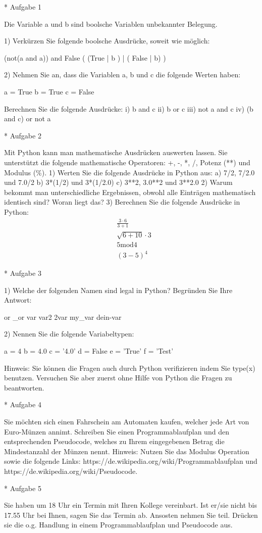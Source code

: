 * Aufgabe 1

Die Variable a und b sind boolsche Variablen unbekannter Belegung. 

1) Verkürzen Sie folgende boolsche Ausdrücke, soweit wie möglich: 

 (not(a and a)) and False
 ( (True | b ) | ( False | b) )
 
 2) Nehmen Sie an, dass die Variablen a, b und c die folgende Werten haben: 
 
 a = True
 b = True
 c = False
 
Berechnen Sie die folgende Ausdrücke:
i) b and c
ii) b or c
iii) not a and c
iv) (b and c) or not a

* Aufgabe 2

Mit Python kann man mathematische Ausdrücken auswerten lassen. Sie unterstützt die folgende mathematische Operatoren: +, -, *, /, Potenz (**) und Modulus (\%).   
1) Werten Sie die folgende Ausdrücke in Python aus: 
a) 7/2, 7/2.0 und 7.0/2
b) 3*(1/2) und 3*(1/2.0)
c) 3**2, 3.0**2 und 3**2.0
2) Warum bekommt man unterschiedliche Ergebnissen, obwohl alle Einträgen mathematisch identisch sind? Woran liegt das?
3) Berechnen Sie die folgende Ausdrücke in Python: 
\begin{align}
&\frac{3 \cdot 6}{3 + 1}\\
&\sqrt{6+10} \cdot 3 \\
&5 \text{mod} 4 \\
&(3-5)^4
\end{align}

* Aufgabe 3

1) Welche der folgenden Namen sind legal in Python? Begründen Sie Ihre Antwort: 

or
_or
var
var2
2var
my_var
dein-var

2) Nennen Sie die folgende Variabeltypen: 

a = 4
b = 4.0
c = '4.0'
d = False
e = 'True'
f = 'Test'

Hinweis: Sie können die Fragen auch durch Python verifizieren indem Sie type(x) benutzen. Versuchen Sie aber zuerst ohne Hilfe von Python die Fragen zu beantworten.   

* Aufgabe 4

Sie möchten sich einen Fahrschein am Automaten kaufen, welcher jede Art von Euro-Münzen annimt. Schreiben Sie einen
Programmablaufplan und den entsprechenden Pseudocode, welches zu Ihrem eingegebenen Betrag die Mindestanzahl der Münzen nennt. 
Hinweis: Nutzen Sie das Modulus Operation sowie die folgende Links: https://de.wikipedia.org/wiki/Programmablaufplan und https://de.wikipedia.org/wiki/Pseudocode.

* Aufgabe 5

Sie haben um 18 Uhr ein Termin mit Ihren Kollege vereinbart. Ist er/sie nicht bis 17.55 Uhr bei Ihnen, sagen Sie das Termin ab. Ansosten nehmen Sie teil. Drücken sie die o.g. Handlung in einem Programmablaufplan und Pseudocode aus.